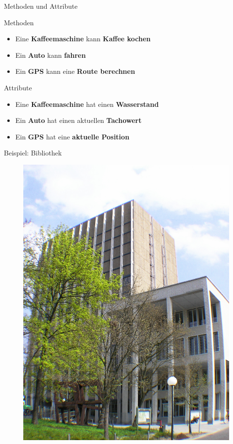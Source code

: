 \documentclass[18pt]{beamer}
\begin{document}
\begin{frame}{Methoden und Attribute}
    \begin{exampleblock}{Methoden}
        \begin{itemize}
            \item Eine \textbf{Kaffeemaschine} kann \textbf{Kaffee kochen}
            \item Ein \textbf{Auto} kann \textbf{fahren}
            \item Ein \textbf{GPS} kann eine \textbf{Route berechnen}
        \end{itemize}
    \end{exampleblock}
    \pause
    \begin{exampleblock}{Attribute}
        \begin{itemize}
            \item Eine \textbf{Kaffeemaschine} hat einen \textbf{Wasserstand}
            \item Ein \textbf{Auto} hat einen aktuellen \textbf{Tachowert}
            \item Ein \textbf{GPS} hat eine \textbf{aktuelle Position}
        \end{itemize}
    \end{exampleblock}
\end{frame}

\begin{frame}{Beispiel: Bibliothek}
    \begin{figure}
        \includegraphics[scale=0.15]{img/kit_bib_sued.jpg}
    \end{figure}
\end{frame}
\end{document}
